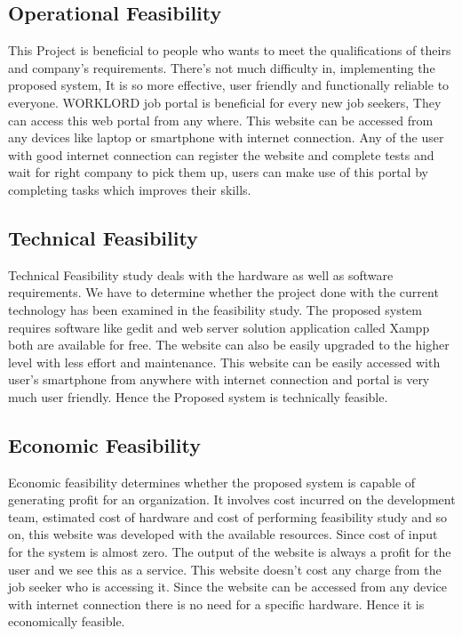 \documentclass[a4paper,12pt]{report}
\begin{document}
\subsection{Operational Feasibility}

\hspace*{12pt} This Project is beneficial to people who wants to meet the qualifications of theirs and 
company's requirements. There's not much difficulty in, implementing the proposed system, It is so more effective, user friendly and functionally reliable to everyone. WORKLORD job portal is beneficial for every new job seekers, They can access this web portal from any where. This
website can be accessed from any devices like laptop or smartphone with internet connection. Any
of the user with good internet connection can register the website and complete tests and wait for right company to pick them up, users can make use of this portal by completing tasks which improves their skills.

\subsection{Technical Feasibility}

\hspace*{12pt}Technical Feasibility study deals with the hardware as well as software requirements. We have to determine whether the project done with the current technology has been examined in the feasibility study. The proposed system requires software like gedit and web server solution application called Xampp both are available for free. The website can also be easily upgraded to the higher level with less effort and maintenance. This website can be easily accessed with user's smartphone from anywhere
with internet connection and portal is very much user friendly. Hence the Proposed system is technically feasible.

\subsection{Economic Feasibility}

\hspace*{12pt}Economic feasibility determines whether the proposed system is capable of generating
profit for an organization. It involves cost incurred on the development team, estimated
cost of hardware and cost of performing feasibility study and so on, this website was developed with
the available resources. Since cost of input for the system is almost zero. The output of the website is
always a profit for the user and we see this as a service. This website doesn’t cost any charge from the job seeker who is accessing it. Since the
website can be accessed from any device with internet connection there is no need for a specific
hardware. Hence it is economically feasible.
\end{document}
